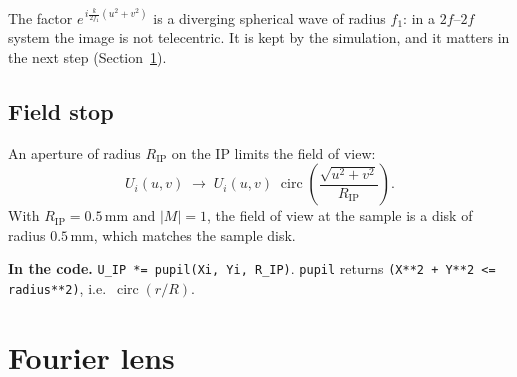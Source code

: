 \documentclass[11pt,a4paper]{article}
\newcommand{\mm}{\,\mathrm{mm}}
\newcommand{\ee}{e}
\newcommand{\circf}{\operatorname{circ}}
\newcommand{\code}[1]{\texttt{\small #1}}
\newcommand{\incode}[1]{\par\smallskip\noindent\colorbox{black!6}{\parbox{\dimexpr\linewidth-2\fboxsep}{\small\textbf{In the code.} #1}}\par\smallskip}
\begin{document}
The factor $\ee^{\,i\frac{k}{2f_1}(u^2+v^2)}$ is a diverging spherical wave of
radius $f_1$: in a $2f$--$2f$ system the image is not telecentric. It is kept
by the simulation, and it matters in the next step (Section~\ref{sec:L2}).

\subsection{Field stop}
\label{sec:stop}

An aperture of radius $R_\mathrm{IP}$ on the IP limits the field of view:
\begin{equation}
  U_i(u,v) \;\to\; U_i(u,v)\;\circf\!\left(\frac{\sqrt{u^2+v^2}}{R_\mathrm{IP}}\right).
\end{equation}
With $R_\mathrm{IP} = 0.5\mm$ and $|M| = 1$, the field of view at the sample is
a disk of radius $0.5\mm$, which matches the sample disk.

\incode{\code{U\_IP *= pupil(Xi, Yi, R\_IP)}. \code{pupil} returns
\code{(X**2 + Y**2 <= radius**2)}, i.e.\ $\circf(r/R)$.}

\section{Fourier lens}
\label{sec:L2}
\end{document}

